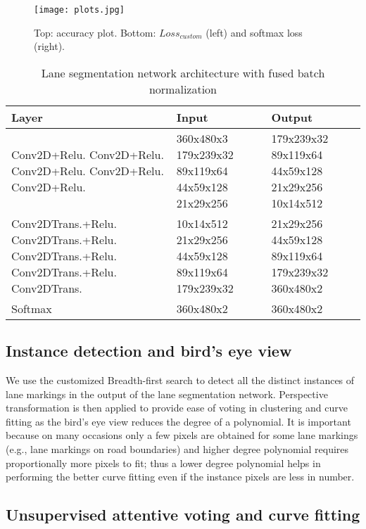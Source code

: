 \documentclass[fleqn,10pt,twocolumn]{ICCAS2019}
\begin{document}
\begin{figure}[thb]
\begin{center}
\texttt{[image: plots.jpg]}
\caption{Top: accuracy plot. Bottom: $Loss_{custom}$ (left) and softmax loss (right).}
\label{acc_loss}
\end{center}
\end{figure}

\begin{center}
\renewcommand{\arraystretch}{1.4}
\begin{table}[htb]
\caption{Lane segmentation network architecture with fused batch normalization \protect\cite{fusedbtn} }
\begin{tabular}{ | m{9em} m{5em} m{5em} | } 
\hline Layer & Input & Output\\
\hline
Conv2D+Relu. Conv2D+Relu. Conv2D+Relu. Conv2D+Relu. Conv2D+Relu. & 360x480x3 179x239x32 89x119x64 44x59x128 21x29x256& 179x239x32 89x119x64 44x59x128 21x29x256 10x14x512\\ 
\hline
Conv2DTrans.+Relu. Conv2DTrans.+Relu. Conv2DTrans.+Relu. Conv2DTrans.+Relu. Conv2DTrans.& 10x14x512 21x29x256 44x59x128 89x119x64 179x239x32& 21x29x256 44x59x128 89x119x64 179x239x32 360x480x2\\ 
\hline
Softmax & 360x480x2 & 360x480x2 \\ 
\hline
\end{tabular}
\label{network}
\end{table}
\end{center}

\subsection{Instance detection and bird's eye view}

We use the customized Breadth-first search to detect all the distinct instances of lane markings in the output of the lane segmentation network. Perspective transformation is then applied to provide ease of voting in clustering and curve fitting as the bird's eye view reduces the degree of a polynomial. It is important because on many occasions only a few pixels are obtained for some lane markings (e.g., lane markings on road boundaries) and higher degree polynomial requires proportionally more pixels to fit; thus a lower degree polynomial helps in performing the better curve fitting even if the instance pixels are less in number.

\subsection{Unsupervised attentive voting and curve fitting}
\end{document}
